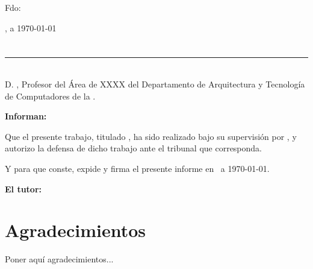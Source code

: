 \vspace{6cm}

\noindent Fdo: \autor

\vspace{2cm}

\begin{flushright}
\ciudad, a \today
\end{flushright}

\chapter*{}
\thispagestyle{empty}

\noindent\rule[-1ex]{\textwidth}{2pt}\\[4.5ex]

D. \textbf{\tutor}, Profesor del Área de XXXX del Departamento de Arquitectura y Tecnología de Computadores de la \universidad.

\vspace{0.5cm}

\vspace{0.5cm}

\textbf{Informan:}

\vspace{0.5cm}

Que el presente trabajo, titulado \textit{\textbf{\titulo}}, ha sido realizado bajo su supervisión por \textbf{\autor}, y 
autorizo la defensa de dicho trabajo ante el tribunal que corresponda.

\vspace{0.5cm}

Y para que conste, expide y firma el presente informe en \ciudad\ a \today.

\vspace{1cm}

\textbf{El tutor:}

\vspace{5cm}

\noindent \textbf{\tutor}

\chapter*{Agradecimientos}
\thispagestyle{empty}

\vspace{1cm}

Poner aquí agradecimientos...

